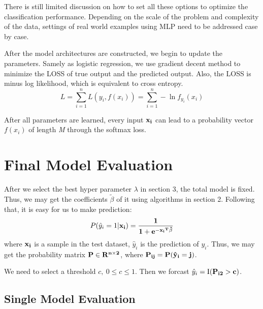 \documentclass[]{article}
\begin{document}
There is still limited discussion on how to set all these options to optimize the classification performance. Depending on the scale of the problem and complexity of the data, settings of real world examples using MLP need to be addressed case by case.

After the model architectures are constructed, we begin to update the parameters. Samely as logistic regression, we use gradient decent method to minimize the LOSS of true output and the predicted output. Also, the LOSS is minus log likelihood, which is equivalent to cross entropy. 
\begin{equation}
	L=\sum_{i=1}^n L(y_i,f(x_i))=\sum_{i=1}^n -\ln f_{y_i}(x_i)
\end{equation}

After all parameters are learned, every input $ \bf{x_i} $ can lead to a probability vector $f(x_i)$ of length \textit{M} through the softmax loss.
\section{Final Model Evaluation}
After we select the best hyper parameter $ \lambda $ in section 3, the total model is fixed. Thus, we may get the coefficients $ \tilde{\beta} $ of it using algorithms in section 2. Following that, it is easy for us to make prediction:
\begin{equation}
P(\hat{y}_i=1|\bf{x_i})=\frac{1}{1+e^{-\bf{x_i}^T\tilde{\beta}}} 
\end{equation}
where $\bf{x_i}$ is a sample in the test dataset, $\hat{y}_i$ is the prediction of $y_i$. Thus, we may get the probability matrix $ \bf{P}\in R^{n\times2} $, where $\bf{P_{ij}}=P(\hat{y}_i=j)$.

We need to select a threshold $ c,\ 0\leq c\leq 1 $. Then we forcast $ \hat{y}_i=\rm I(\bf{P}_{i2}>c) $.
\subsection{Single Model Evaluation}
\end{document}
